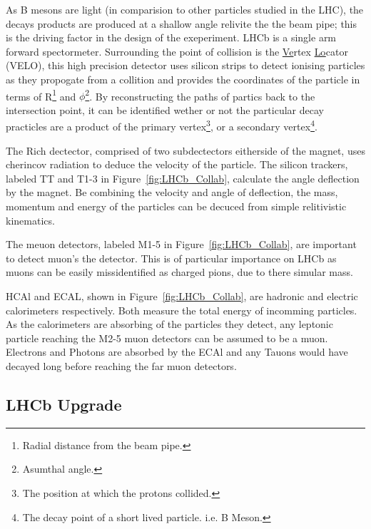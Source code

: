     As B mesons are light (in comparision to other particles studied in the LHC), the decays products are produced at a shallow angle relivite the the beam pipe;
    this is the driving factor in the design of the exeperiment. 
    LHCb is a single arm forward spectormeter.
    Surrounding the point of collision is the \underline{Ve}rtex \underline{Lo}cator (VELO), this high precision detector uses silicon strips to detect ionising particles as they propogate from a collition and provides the coordinates of the particle in terms of R\footnote{Radial distance from the beam pipe.} and $\phi$\footnote{Asumthal angle.}.
    By reconstructing the paths of partics back to the intersection point, it can be identified wether or not the particular decay practicles are a product of the primary vertex\footnote{The position at which the protons collided.}, or a secondary vertex\footnote{The decay point of a short lived particle. i.e. B Meson.}.
    \par
    The Rich dectector, comprised of two subdectectors eitherside of the magnet, uses cherincov radiation to deduce the velocity of the particle. The silicon trackers, labeled TT and T1-3 in Figure~\ref{fig:LHCb_Collab}, calculate the angle deflection by the magnet. Be combining the velocity and angle of deflection, the mass, momentum and energy of the particles can be decuced from simple relitivistic kinematics.
    \par
    The meuon detectors, labeled M1-5 in Figure~\ref{fig:LHCb_Collab}, are important to detect muon's the detector. 
    This is of particular importance on LHCb as muons can be easily missidentified as charged pions, due to there simular mass.
    \par
    HCAl and ECAL, shown in Figure~\ref{fig:LHCb_Collab}, are hadronic and electric calorimeters respectively. 
    Both measure the total energy of incomming particles.
    As the calorimeters are absorbing of the particles they detect, any leptonic particle reaching the M2-5 muon detectors can be assumed to be a muon.
    Electrons and Photons are absorbed by the ECAl and any Tauons would have decayed long before reaching the far muon detectors.

      \subsection{LHCb Upgrade} %
      \label{sub:lhcb_upgrade}

